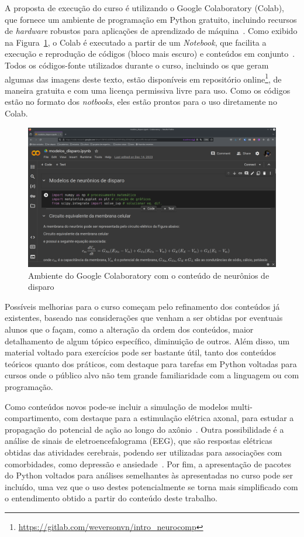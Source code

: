 A proposta de execução do curso é utilizando o Google Colaboratory (Colab), que fornece um ambiente de programação em Python gratuito, incluindo recursos de \textit{hardware} robustos para aplicações de aprendizado de máquina~\cite{bisong_google_2019}. Como exibido na Figura~\ref{fig:colab}, o Colab é executado a partir de um \textit{Notebook}, que facilita a execução e reprodução de códigos (bloco mais escuro) e conteúdos em conjunto~\cite{shen_interactive_2014}. Todos os códigos-fonte utilizados durante o curso, incluindo os que geram algumas das imagens deste texto, estão disponíveis em repositório online\footnote{\url{https://gitlab.com/weversonvn/intro_neurocomp}}, de maneira gratuita e com uma licença permissiva livre para uso. Como os códigos estão no formato dos \textit{notbooks}, eles estão prontos para o uso diretamente no Colab.
\begin{figure}[tb]
	\centering
	\caption[Ambiente do Google Colaboratory com o conteúdo de neurônios de disparo]{Ambiente do Google Colaboratory com o conteúdo de neurônios de disparo}
	\label{fig:colab}
	\includegraphics[width=0.7\linewidth]{figs/colab}
\end{figure}

Possíveis melhorias para o curso começam pelo refinamento dos conteúdos já existentes, baseado nas considerações que venham a ser obtidas por eventuais alunos que o façam, como a alteração da ordem dos conteúdos, maior detalhamento de algum tópico específico, diminuição de outros. Além disso, um material voltado para exercícios pode ser bastante útil, tanto dos conteúdos teóricos quanto dos práticos, com destaque para tarefas em Python voltadas para cursos onde o público alvo não tem grande familiaridade com a linguagem ou com programação.

Como conteúdos novos pode-se incluir a simulação de modelos multi-compartimento, com destaque para a estimulação elétrica axonal, para estudar a propagação do potencial de ação ao longo do axônio~\cite{rattay_model_2001}. Outra possibilidade é a análise de sinais de eletroencefalograma (EEG), que são respostas elétricas obtidas das atividades cerebrais, podendo ser utilizadas para associações com comorbidades, como depressão e ansiedade~\cite{cavanagh_multiple_2019}. Por fim, a apresentação de pacotes do Python voltados para análises semelhantes às apresentadas no curso pode ser incluído, uma vez que o uso destes potencialmente se torna mais simplificado com o entendimento obtido a partir do conteúdo deste trabalho.

